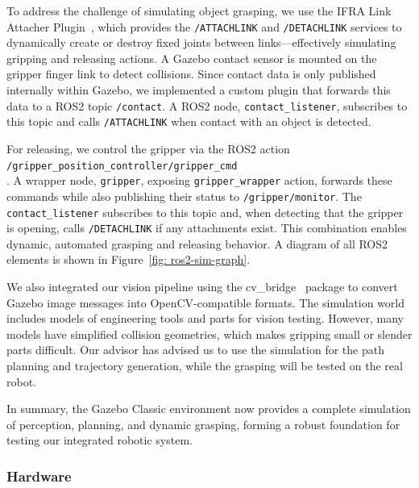 \documentclass[12pt]{extarticle}
\begin{document}
To address the challenge of simulating object grasping, we use the IFRA Link Attacher Plugin~\cite{ifra_link_attacher}, which provides the \texttt{/ATTACHLINK} and \texttt{/DETACHLINK} services to dynamically create or destroy fixed joints between links—effectively simulating gripping and releasing actions. A Gazebo contact sensor is mounted on the gripper finger link to detect collisions. Since contact data is only published internally within Gazebo, we implemented a custom plugin that forwards this data to a ROS2 topic \texttt{/contact}. A ROS2 node, \texttt{contact\_listener}, subscribes to this topic and calls \texttt{/ATTACHLINK} when contact with an object is detected.

For releasing, we control the gripper via the ROS2 action\\\texttt{/gripper\_position\_controller/gripper\_cmd}\\. A wrapper node, \texttt{gripper}, exposing \texttt{gripper\_wrapper} action, forwards these commands while also publishing their status to \texttt{/gripper/monitor}. The \texttt{contact\_listener} subscribes to this topic and, when detecting that the gripper is opening, calls \texttt{/DETACHLINK} if any attachments exist. This combination enables dynamic, automated grasping and releasing behavior. A diagram of all ROS2 elements is shown in Figure~\ref{fig: ros2-sim-graph}.

We also integrated our vision pipeline using the cv\_bridge~\cite{cv_bridge} package to convert Gazebo image messages into OpenCV-compatible formats. The simulation world includes models of engineering tools and parts for vision testing. However, many models have simplified collision geometries, which makes gripping small or slender parts difficult. Our advisor has advised us to use the simulation for the path planning and trajectory generation, while the grasping will be tested on the real robot.

In summary, the Gazebo Classic environment now provides a complete simulation of perception, planning, and dynamic grasping, forming a robust foundation for testing our integrated robotic system.

\subsubsection{Hardware}
\end{document}
